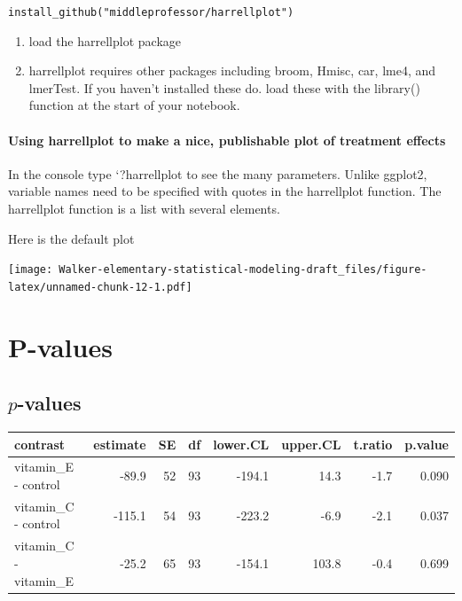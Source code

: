 \documentclass[]{book}
\newenvironment{Shaded}{\begin{snugshade}}{\end{snugshade}}
\newcommand{\KeywordTok}[1]{\textcolor[rgb]{0.13,0.29,0.53}{\textbf{#1}}}
\newcommand{\DataTypeTok}[1]{\textcolor[rgb]{0.13,0.29,0.53}{#1}}
\newcommand{\StringTok}[1]{\textcolor[rgb]{0.31,0.60,0.02}{#1}}
\newcommand{\CommentTok}[1]{\textcolor[rgb]{0.56,0.35,0.01}{\textit{#1}}}
\newcommand{\OperatorTok}[1]{\textcolor[rgb]{0.81,0.36,0.00}{\textbf{#1}}}
\newcommand{\NormalTok}[1]{#1}
\providecommand{\tightlist}{%
  \setlength{\itemsep}{0pt}\setlength{\parskip}{0pt}}
\theoremstyle{definition}
\theoremstyle{definition}
\theoremstyle{definition}
\theoremstyle{remark}
\begin{document}
\texttt{install\_github("middleprofessor/harrellplot")}

\begin{enumerate}
\def\labelenumi{\arabic{enumi}.}
\setcounter{enumi}{2}
\tightlist
\item
  load the harrellplot package
\item
  harrellplot requires other packages including broom, Hmisc, car, lme4,
  and lmerTest. If you haven't installed these do. load these with the
  library() function at the start of your notebook.
\end{enumerate}

\subsubsection{Using harrellplot to make a nice, publishable plot of
treatment
effects}\label{using-harrellplot-to-make-a-nice-publishable-plot-of-treatment-effects}

In the console type `?harrellplot to see the many parameters. Unlike
ggplot2, variable names need to be specified with quotes in the
harrellplot function. The harrellplot function is a list with several
elements.

Here is the default plot

\begin{Shaded}
\end{Shaded}

\texttt{[image: Walker-elementary-statistical-modeling-draft\_files/figure-latex/unnamed-chunk-12-1.pdf]}

\chapter{P-values}\label{p-values}

\section{\texorpdfstring{\(p\)-values}{p-values}}\label{p-values-1}

\begin{tabular}{l|r|r|r|r|r|r|r}
\hline
contrast & estimate & SE & df & lower.CL & upper.CL & t.ratio & p.value\\
\hline
vitamin\_E - control & -89.9 & 52 & 93 & -194.1 & 14.3 & -1.7 & 0.090\\
\hline
vitamin\_C - control & -115.1 & 54 & 93 & -223.2 & -6.9 & -2.1 & 0.037\\
\hline
vitamin\_C - vitamin\_E & -25.2 & 65 & 93 & -154.1 & 103.8 & -0.4 & 0.699\\
\hline
\end{tabular}
\end{document}
